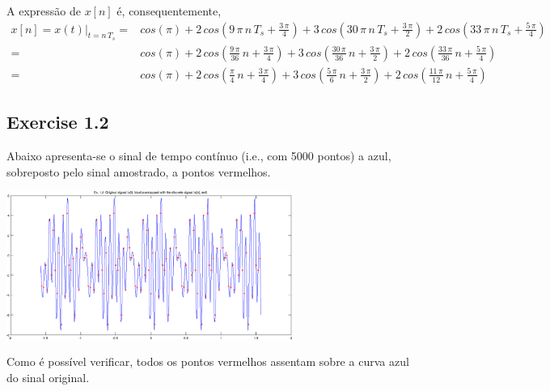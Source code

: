 \documentclass[a4paper]{article}
\begin{document}
\noindent A expressão de $x[n]$ é, consequentemente,
\begin{eqnarray}
	x[n] = x(t)|_{t = n \, T_s} = & cos(\pi) + 2 \, cos\left( 9 \, \pi \, n \, T_s + \frac{3 \, \pi}{4} \right) + 3 \, cos\left( 30 \, \pi \, n \, T_s + \frac{3 \, \pi}{2} \right) + 2 \, cos\left( 33 \, \pi \, n \, T_s + \frac{5 \, \pi}{4} \right) \\
	= & cos(\pi) + 2 \, cos\left( \frac{9 \, \pi}{36} \, n + \frac{3 \, \pi}{4} \right) + 3 \, cos\left( \frac{30 \, \pi}{36} \, n + \frac{3 \, \pi}{2} \right) + 2 \, cos\left( \frac{33 \, \pi}{36} \, n + \frac{5 \, \pi}{4} \right) \\
	= & cos(\pi) + 2 \, cos\left( \frac{\pi}{4} \, n + \frac{3 \, \pi}{4} \right) + 3 \, cos\left( \frac{5 \, \pi}{6} \, n + \frac{3 \, \pi}{2} \right) + 2 \, cos\left( \frac{11 \, \pi}{12} \, n + \frac{5 \, \pi}{4} \right)
\end{eqnarray}

\subsection{Exercise 1.2}
\noindent Abaixo apresenta-se o sinal de tempo contínuo (i.e., com 5000 pontos) a azul, sobreposto pelo sinal amostrado, a pontos vermelhos.
\begin{center}
	\includegraphics[width=0.70\textwidth]{images/ex_1_2.png}
	\label{fig:ex_1_2}
\end{center}

\noindent Como é possível verificar, todos os pontos vermelhos assentam sobre a curva azul do sinal original.
\clearpage
\end{document}
